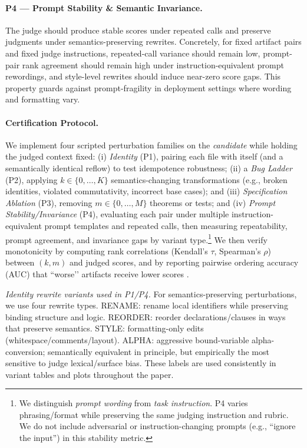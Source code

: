\documentclass[numbers]{article}
\begin{document}
\paragraph{P4 — Prompt Stability \& Semantic Invariance.}
The judge should produce stable scores under repeated calls and preserve judgments under semantics-preserving rewrites.
Concretely, for fixed artifact pairs and fixed judge instructions, repeated-call variance should remain low, prompt-pair rank agreement should remain high under instruction-equivalent prompt rewordings, and style-level rewrites should induce near-zero score gaps.
This property guards against prompt-fragility in deployment settings where wording and formatting vary.

\paragraph{Certification Protocol.}
We implement four scripted perturbation families on the \emph{candidate} while holding the judged context fixed:
(i) \emph{Identity} (P1), pairing each file with itself (and a semantically identical reflow) to test idempotence robustness;
(ii) a \emph{Bug Ladder} (P2), applying $k\!\in\!\{0,\ldots,K\}$ semantics-changing transformations (e.g., broken identities, violated commutativity, incorrect base cases); and
(iii) \emph{Specification Ablation} (P3), removing $m\!\in\!\{0,\ldots,M\}$ theorems or tests; and
(iv) \emph{Prompt Stability/Invariance} (P4), evaluating each pair under multiple instruction-equivalent prompt templates and repeated calls, then measuring repeatability, prompt agreement, and invariance gaps by variant type.\footnote{We distinguish \emph{prompt wording} from \emph{task instruction}. P4 varies phrasing/format while preserving the same judging instruction and rubric. We do not include adversarial or instruction-changing prompts (e.g., ``ignore the input'') in this stability metric.}
We then verify monotonicity by computing rank correlations (Kendall’s $\tau$, Spearman’s $\rho$) between $(k,m)$ and judged scores, and by reporting pairwise ordering accuracy (AUC) that “worse’’ artifacts receive lower scores \citep{TongZhang2024CodeJudge,Zhuo2024ICEScore}.

\noindent\textit{Identity rewrite variants used in P1/P4.}
For semantics-preserving perturbations, we use four rewrite types.
\textsc{RENAME}: rename local identifiers while preserving binding structure and logic.
\textsc{REORDER}: reorder declarations/clauses in ways that preserve semantics.
\textsc{STYLE}: formatting-only edits (whitespace/comments/layout).
\textsc{ALPHA}: aggressive bound-variable alpha-conversion; semantically equivalent in principle, but empirically the most sensitive to judge lexical/surface bias.
These labels are used consistently in variant tables and plots throughout the paper.
\end{document}
